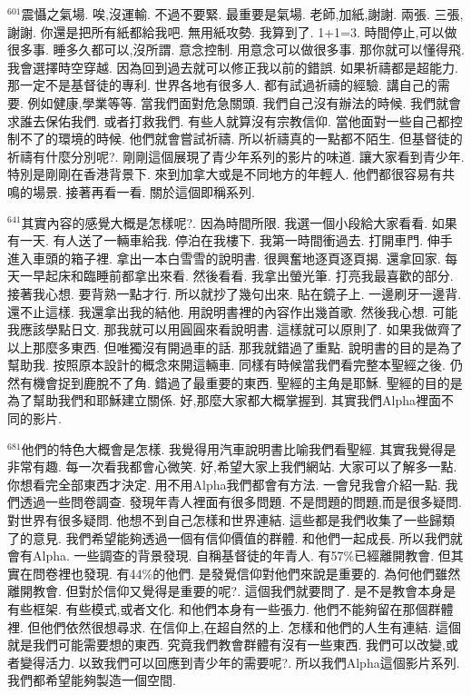 \documentclass{book}
\begin{document}
$^{601}$震懾之氣場.
唉,沒運輸.
不過不要緊.
最重要是氣場.
老師,加紙,謝謝.
兩張.
三張,謝謝.
你還是把所有紙都給我吧.
無用紙攻勢.
我算到了.
1+1=3.
時間停止,可以做很多事.
睡多久都可以,沒所謂.
意念控制.
用意念可以做很多事.
那你就可以懂得飛.
我會選擇時空穿越.
因為回到過去就可以修正我以前的錯誤.
如果祈禱都是超能力.
那一定不是基督徒的專利.
世界各地有很多人.
都有試過祈禱的經驗.
講自己的需要.
例如健康,學業等等.
當我們面對危急關頭.
我們自己沒有辦法的時候.
我們就會求誰去保佑我們.
或者打救我們.
有些人就算沒有宗教信仰.
當他面對一些自己都控制不了的環境的時候.
他們就會嘗試祈禱.
所以祈禱真的一點都不陌生.
但基督徒的祈禱有什麼分別呢?.
剛剛這個展現了青少年系列的影片的味道.
讓大家看到青少年.
特別是剛剛在香港背景下.
來到加拿大或是不同地方的年輕人.
他們都很容易有共鳴的場景.
接著再看一看.
關於這個即稱系列.

$^{641}$其實內容的感覺大概是怎樣呢?.
因為時間所限.
我選一個小段給大家看看.
如果有一天.
有人送了一輛車給我.
停泊在我樓下.
我第一時間衝過去.
打開車門.
伸手進入車頭的箱子裡.
拿出一本白雪雪的說明書.
很興奮地逐頁逐頁揭.
還拿回家.
每天一早起床和臨睡前都拿出來看.
然後看看.
我拿出螢光筆.
打亮我最喜歡的部分.
接著我心想.
要背熟一點才行.
所以就抄了幾句出來.
貼在鏡子上.
一邊刷牙一邊背.
還不止這樣.
我還拿出我的結他.
用說明書裡的內容作出幾首歌.
然後我心想.
可能我應該學點日文.
那我就可以用圓圓來看說明書.
這樣就可以原則了.
如果我做齊了以上那麼多東西.
但唯獨沒有開過車的話.
那我就錯過了重點.
說明書的目的是為了幫助我.
按照原本設計的概念來開這輛車.
同樣有時候當我們看完整本聖經之後.
仍然有機會捉到鹿脫不了角.
錯過了最重要的東西.
聖經的主角是耶穌.
聖經的目的是為了幫助我們和耶穌建立關係.
好,那麼大家都大概掌握到.
其實我們Alpha裡面不同的影片.

$^{681}$他們的特色大概會是怎樣.
我覺得用汽車說明書比喻我們看聖經.
其實我覺得是非常有趣.
每一次看我都會心微笑.
好,希望大家上我們網站.
大家可以了解多一點.
你想看完全部東西才決定.
用不用Alpha我們都會有方法.
一會兒我會介紹一點.
我們透過一些問卷調查.
發現年青人裡面有很多問題.
不是問題的問題,而是很多疑問.
對世界有很多疑問.
他想不到自己怎樣和世界連結.
這些都是我們收集了一些歸類了的意見.
我們希望能夠透過一個有信仰價值的群體.
和他們一起成長.
所以我們就會有Alpha.
一些調查的背景發現.
自稱基督徒的年青人.
有57\%已經離開教會.
但其實在問卷裡也發現.
有44\%的他們.
是發覺信仰對他們來說是重要的.
為何他們雖然離開教會.
但對於信仰又覺得是重要的呢?.
這個我們就要問了.
是不是教會本身是有些框架.
有些模式,或者文化.
和他們本身有一些張力.
他們不能夠留在那個群體裡.
但他們依然很想尋求.
在信仰上,在超自然的上.
怎樣和他們的人生有連結.
這個就是我們可能需要想的東西.
究竟我們教會群體有沒有一些東西.
我們可以改變,或者變得活力.
以致我們可以回應到青少年的需要呢?.
所以我們Alpha這個影片系列.
我們都希望能夠製造一個空間.
\end{document}
